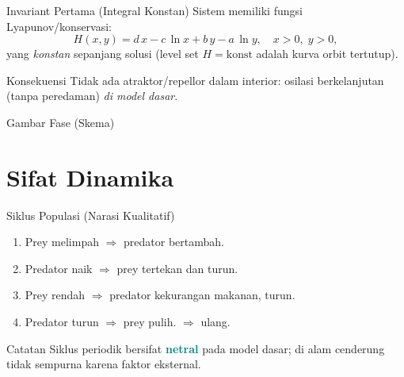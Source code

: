 \documentclass[aspectratio=32]{beamer}
\newcommand{\jsg}[1]{\textcolor{teal}{\textbf{#1}}}
\begin{document}
\begin{frame}{Invariant Pertama (Integral Konstan)}
  \small
  Sistem memiliki fungsi Lyapunov/konservasi:
  \[
  H(x,y)=d\,x- c\,\ln x + b\,y - a\,\ln y,\quad x>0,\;y>0,
  \]
  yang \textit{konstan} sepanjang solusi (level set \(H=\text{konst}\) adalah kurva orbit tertutup).
  \begin{block}{Konsekuensi}
    Tidak ada atraktor/repellor dalam interior: osilasi berkelanjutan (tanpa peredaman) \textit{di model dasar}.
  \end{block}
\end{frame}

\begin{frame}{Gambar Fase (Skema)}
  \centering
\end{frame}

\section{Sifat Dinamika}

\begin{frame}{Siklus Populasi (Narasi Kualitatif)}
  \begin{enumerate}
    \item Prey melimpah \(\Rightarrow\) predator bertambah.
    \item Predator naik \(\Rightarrow\) prey tertekan dan turun.
    \item Prey rendah \(\Rightarrow\) predator kekurangan makanan, turun.
    \item Predator turun \(\Rightarrow\) prey pulih. \(\Rightarrow\) ulang.
  \end{enumerate}
  \vspace{0.4em}
  \begin{block}{Catatan}
    Siklus periodik bersifat \jsg{netral} pada model dasar; di alam cenderung tidak sempurna karena faktor eksternal.
  \end{block}
\end{frame}
\end{document}
